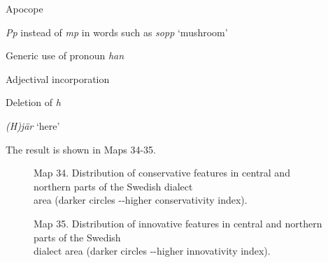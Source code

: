 \item 

Apocope

\item 

\textit{Pp} instead of \textit{mp }in words such as \textit{sopp} ‘mushroom’

\item 

Generic use of pronoun \textit{han}

\item 

Adjectival incorporation

\item 

Deletion of \textit{h}

\item 

\textit{(H)jär} ‘here’


The result is shown in Maps 34-35. 

\begin{figure}[h]

\begin{minipage}{6.27083in}

Map 34. Distribution of conservative features in central and northern parts of the Swedish dialect\\
 area (darker circles -{}-higher conservativity index).


\end{minipage}

\end{figure}



\begin{figure}[h]

\begin{minipage}{6.30208in}

Map 35. Distribution of innovative features in central and northern parts of the Swedish\\
 dialect area (darker circles -{}-higher innovativity index).


\end{minipage}

\end{figure}

